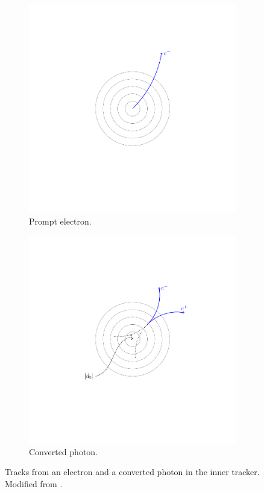 \begin{figure}[htbp]
  \centering
  \begin{subfigure}{0.49\textwidth}
    \centering
    \includegraphics[trim = 35mm 40mm 30mm 30mm, clip,width=\textwidth]{doca_electron}
    \caption{Prompt electron.}
    \label{fig:electron_path}
  \end{subfigure}
  \begin{subfigure}{0.49\textwidth}
    \centering
    \includegraphics[trim = 35mm 40mm 30mm 30mm, clip,width=\textwidth]{doca}
    \caption{Converted photon.}
    \label{fig:photon_path}
  \end{subfigure}
  \caption{Tracks from an electron and a converted photon in the inner tracker. Modified from \cite{barge2009conversion}.}
  \label{fig:conversion}
\end{figure}


